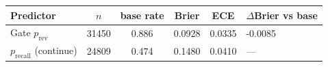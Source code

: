 \begin{tabular}{lcccc}
\toprule
Predictor & $n$ & base rate & Brier & ECE & $\Delta$Brier vs base \\
\midrule
Gate $p_{\mathrm{rev}}$ & 31450 & 0.886 & 0.0928 & 0.0335 & -0.0085 \\
$p_{\mathrm{recall}}$ (continue) & 24809 & 0.474 & 0.1480 & 0.0410 & — \\
\bottomrule
\end{tabular}

